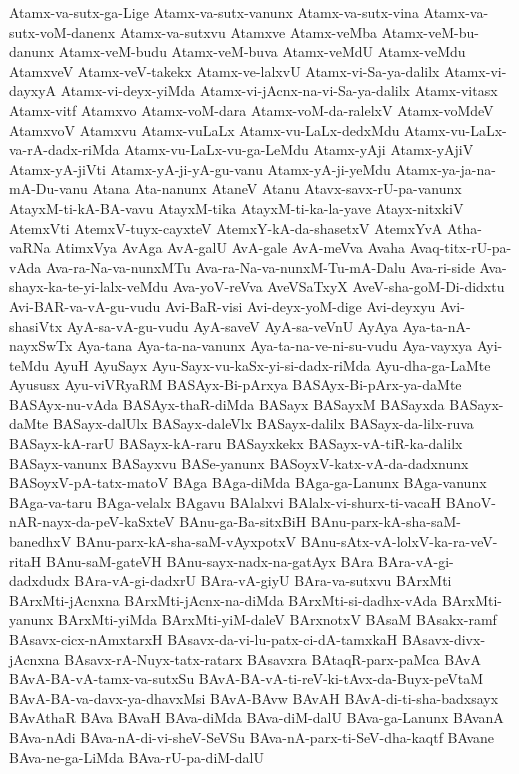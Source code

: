 {Atamx-va-sutx-ga-Lige
Atamx-va-sutx-vanunx
Atamx-va-sutx-vina
Atamx-va-sutx-voM-danenx
Atamx-va-sutxvu
Atamxve
Atamx-veMba
Atamx-veM-bu-danunx
Atamx-veM-budu
Atamx-veM-buva
Atamx-veMdU
Atamx-veMdu
AtamxveV
Atamx-veV-takekx
Atamx-ve-lalxvU
Atamx-vi-Sa-ya-dalilx
Atamx-vi-dayxyA
Atamx-vi-deyx-yiMda
Atamx-vi-jAcnx-na-vi-Sa-ya-dalilx
Atamx-vitasx
Atamx-vitf
Atamxvo
Atamx-voM-dara
Atamx-voM-da-ralelxV
Atamx-voMdeV
AtamxvoV
Atamxvu
Atamx-vuLaLx
Atamx-vu-LaLx-dedxMdu
Atamx-vu-LaLx-va-rA-dadx-riMda
Atamx-vu-LaLx-vu-ga-LeMdu
Atamx-yAji
Atamx-yAjiV
Atamx-yA-jiVti
Atamx-yA-ji-yA-gu-vanu
Atamx-yA-ji-yeMdu
Atamx-ya-ja-na-mA-Du-vanu
Atana
Ata-nanunx
AtaneV
Atanu
Atavx-savx-rU-pa-vanunx
AtayxM-ti-kA-BA-vavu
AtayxM-tika
AtayxM-ti-ka-la-yave
Atayx-nitxkiV
AtemxVti
AtemxV-tuyx-cayxteV
AtemxY-kA-da-shasetxV
AtemxYvA
Atha-vaRNa
AtimxVya
AvAga
AvA-galU
AvA-gale
AvA-meVva
Avaha
Avaq-titx-rU-pa-vAda
Ava-ra-Na-va-nunxMTu
Ava-ra-Na-va-nunxM-Tu-mA-Dalu
Ava-ri-side
Ava-shayx-ka-te-yi-lalx-veMdu
Ava-yoV-reVva
AveVSaTxyX
AveV-sha-goM-Di-didxtu
Avi-BAR-va-vA-gu-vudu
Avi-BaR-visi
Avi-deyx-yoM-dige
Avi-deyxyu
Avi-shasiVtx
AyA-sa-vA-gu-vudu
AyA-saveV
AyA-sa-veVnU
AyAya
Aya-ta-nA-nayxSwTx
Aya-tana
Aya-ta-na-vanunx
Aya-ta-na-ve-ni-su-vudu
Aya-vayxya
Ayi-teMdu
AyuH
AyuSayx
Ayu-Sayx-vu-kaSx-yi-si-dadx-riMda
Ayu-dha-ga-LaMte
Ayususx
Ayu-viVRyaRM
BASAyx-Bi-pArxya
BASAyx-Bi-pArx-ya-daMte
BASAyx-nu-vAda
BASAyx-thaR-diMda
BASayx
BASayxM
BASayxda
BASayx-daMte
BASayx-dalUlx
BASayx-daleVlx
BASayx-dalilx
BASayx-da-lilx-ruva
BASayx-kA-rarU
BASayx-kA-raru
BASayxkekx
BASayx-vA-tiR-ka-dalilx
BASayx-vanunx
BASayxvu
BASe-yanunx
BASoyxV-katx-vA-da-dadxnunx
BASoyxV-pA-tatx-matoV
BAga
BAga-diMda
BAga-ga-Lanunx
BAga-vanunx
BAga-va-taru
BAga-velalx
BAgavu
BAlalxvi
BAlalx-vi-shurx-ti-vacaH
BAnoV-nAR-nayx-da-peV-kaSxteV
BAnu-ga-Ba-sitxBiH
BAnu-parx-kA-sha-saM-banedhxV
BAnu-parx-kA-sha-saM-vAyxpotxV
BAnu-sAtx-vA-lolxV-ka-ra-veV-ritaH
BAnu-saM-gateVH
BAnu-sayx-nadx-na-gatAyx
BAra
BAra-vA-gi-dadxdudx
BAra-vA-gi-dadxrU
BAra-vA-giyU
BAra-va-sutxvu
BArxMti
BArxMti-jAcnxna
BArxMti-jAcnx-na-diMda
BArxMti-si-dadhx-vAda
BArxMti-yanunx
BArxMti-yiMda
BArxMti-yiM-daleV
BArxnotxV
BAsaM
BAsakx-ramf
BAsavx-cicx-nAmxtarxH
BAsavx-da-vi-lu-patx-ci-dA-tamxkaH
BAsavx-divx-jAcnxna
BAsavx-rA-Nuyx-tatx-ratarx
BAsavxra
BAtaqR-parx-paMca
BAvA
BAvA-BA-vA-tamx-va-sutxSu
BAvA-BA-vA-ti-reV-ki-tAvx-da-Buyx-peVtaM
BAvA-BA-va-davx-ya-dhavxMsi
BAvA-BAvw
BAvAH
BAvA-di-ti-sha-badxsayx
BAvAthaR
BAva
BAvaH
BAva-diMda
BAva-diM-dalU
BAva-ga-Lanunx
BAvanA
BAva-nAdi
BAva-nA-di-vi-sheV-SeVSu
BAva-nA-parx-ti-SeV-dha-kaqtf
BAvane
BAva-ne-ga-LiMda
BAva-rU-pa-diM-dalU
}

